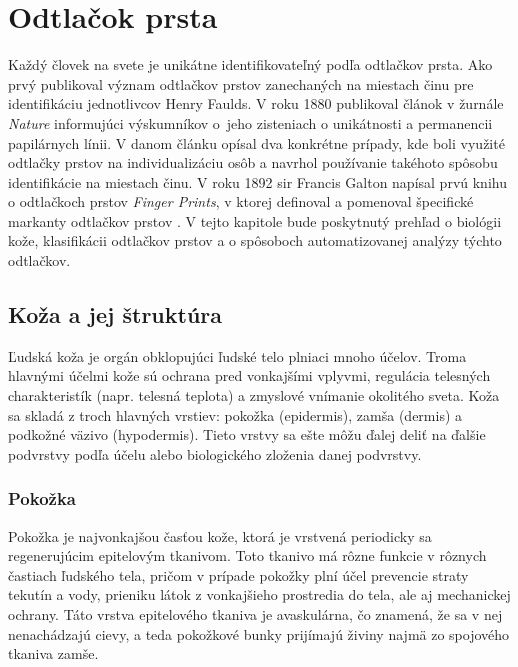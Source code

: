 
\chapter{Odtlačok prsta} \label{kap:odtlacok}
  Každý človek na svete je unikátne identifikovateľný podľa odtlačkov prsta. Ako prvý publikoval význam odtlačkov prstov zanechaných na miestach činu
  pre identifikáciu jednotlivcov Henry Faulds. V roku 1880 publikoval článok v žurnále \emph{Nature} informujúci výskumníkov o~jeho zisteniach o unikátnosti
  a permanencii papilárnych línii. V danom článku opísal dva konkrétne prípady, kde boli využité odtlačky prstov na individualizáciu osôb a navrhol
  používanie takéhoto spôsobu identifikácie na miestach činu. V roku 1892 sir Francis Galton napísal prvú knihu o odtlačkoch
  prstov \emph{Finger Prints}, v ktorej definoval a pomenoval špecifické markanty odtlačkov prstov \cite{FingerprintSrcBook}.
  V tejto kapitole bude poskytnutý prehľad o biológii kože, klasifikácii odtlačkov prstov a o spôsoboch automatizovanej analýzy týchto odtlačkov.
  
  
  \section{Koža a jej štruktúra}
  Ľudská koža je orgán obklopujúci ľudské telo plniaci mnoho účelov. Troma hlavnými účelmi kože sú ochrana pred vonkajšími vplyvmi, regulácia
  telesných charakteristík (napr. telesná teplota) a zmyslové vnímanie okolitého sveta.
  Koža sa skladá z troch hlavných vrstiev: pokožka (epidermis), zamša (dermis) a podkožné väzivo (hypodermis). Tieto vrstvy sa ešte môžu ďalej deliť
  na ďalšie podvrstvy podľa účelu alebo biologického zloženia danej podvrstvy.

  \subsection{Pokožka}
  Pokožka je najvonkajšou časťou kože, ktorá je vrstvená periodicky sa regenerujúcim epitelovým tkanivom. Toto tkanivo má rôzne funkcie v rôznych
  častiach ľudského tela, pričom v prípade pokožky plní účel prevencie straty tekutín a vody, prieniku látok z vonkajšieho prostredia do tela, ale aj
  mechanickej ochrany. Táto vrstva epitelového tkaniva je avaskulárna, čo znamená, že sa v nej nenachádzajú cievy, a teda pokožkové bunky prijímajú živiny
  najmä zo spojového tkaniva zamše.
  

